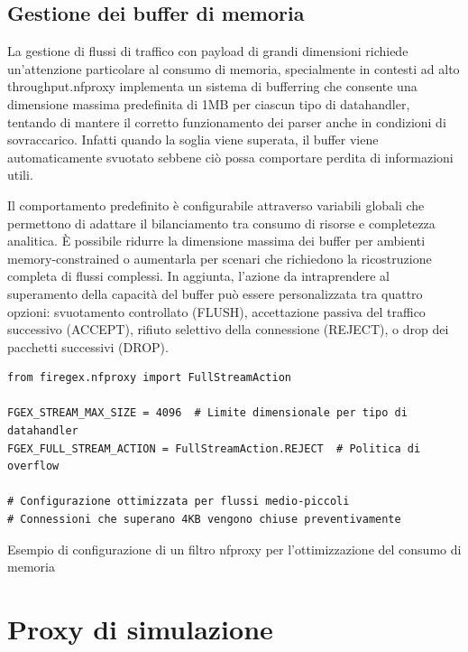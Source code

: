 \subsection{Gestione dei buffer di memoria}

La gestione di flussi di traffico con payload di grandi dimensioni richiede un'attenzione particolare al consumo di memoria, specialmente in contesti ad alto throughput.\@ \gls{nfproxy} implementa un sistema di bufferring che consente una dimensione massima predefinita di 1MB per ciascun tipo di datahandler, tentando di mantere il corretto funzionamento dei parser anche in condizioni di sovraccarico. Infatti quando la soglia viene superata, il buffer viene automaticamente svuotato sebbene ciò possa comportare perdita di informazioni utili.

Il comportamento predefinito è configurabile attraverso variabili globali che permettono di adattare il bilanciamento tra consumo di risorse e completezza analitica. È possibile ridurre la dimensione massima dei buffer per ambienti memory-constrained o aumentarla per scenari che richiedono la ricostruzione completa di flussi complessi. In aggiunta, l'azione da intraprendere al superamento della capacità del buffer può essere personalizzata tra quattro opzioni: svuotamento controllato (FLUSH), accettazione passiva del traffico successivo (ACCEPT), rifiuto selettivo della connessione (REJECT), o drop dei pacchetti successivi (DROP).

\begin{listing}[H]
\begin{verbatim}
from firegex.nfproxy import FullStreamAction

FGEX_STREAM_MAX_SIZE = 4096  # Limite dimensionale per tipo di datahandler
FGEX_FULL_STREAM_ACTION = FullStreamAction.REJECT  # Politica di overflow

# Configurazione ottimizzata per flussi medio-piccoli
# Connessioni che superano 4KB vengono chiuse preventivamente
\end{verbatim}
\caption{Esempio di configurazione di un filtro nfproxy per l'ottimizzazione del consumo di memoria}\label{lst:nfproxy_memory_limit_example}
\end{listing}

\section{Proxy di simulazione}

